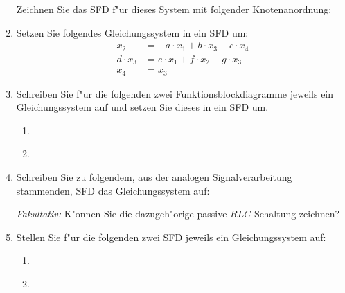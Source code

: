 \begin{enumerate}
  Zeichnen Sie das SFD f"ur dieses System mit folgender
  Knotenanordnung:
 \begin{center}
\end{center}
 

\item Setzen Sie folgendes Gleichungssystem in ein SFD um:
  \begin{align*}
    x_2 &= -a \cdot x_1 + b \cdot x_3 - c \cdot x_4 \\
    d \cdot x_3 &= e \cdot x_1 + f \cdot x_2 - g \cdot x_3 \\
    x_4 &= x_3
  \end{align*}

\item Schreiben Sie f"ur die folgenden zwei Funktionsblockdiagramme
  jeweils ein Gleichungssystem auf und setzen Sie dieses in ein SFD um.

  \begin{enumerate}
  \item ~
    \begin{center}
\end{center}

  \item ~
    \begin{center}
\end{center}

  \end{enumerate}
\item Schreiben Sie zu folgendem, aus der analogen Signalverarbeitung
  stammenden, SFD das Gleichungssystem auf:
\begin{center}
\end{center}

  \emph{Fakultativ:} K"onnen Sie die dazugeh"orige passive
  $RLC$-Schaltung zeichnen?
\item Stellen Sie f"ur die folgenden zwei SFD jeweils ein
  Gleichungssystem auf:

  \begin{enumerate}
  \item ~ 
  \begin{center}
  \end{center}
  \item ~
   \begin{center}
  \end{center}
  \end{enumerate}


\end{enumerate}
